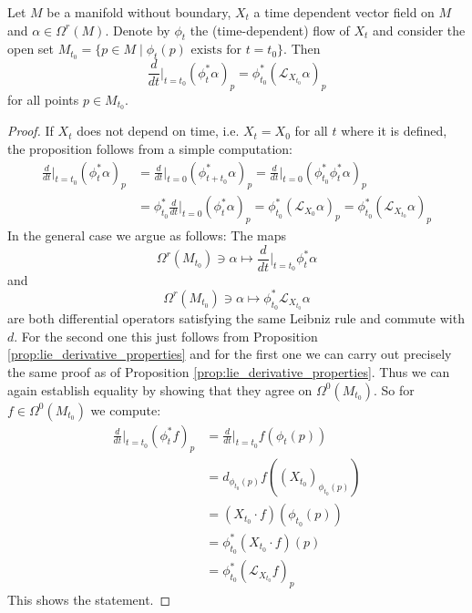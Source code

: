 \begin{proposition}
    \label{prop:lie_derivative_formula}
    Let $M$ be a manifold without boundary, $X_t$ a time dependent vector field on $M$ and $\alpha \in \Omega^r(M).$ Denote by $\phi_t$ the (time-dependent) flow of $X_t$ and consider the open set $M_{t_0} = \{p\in M \mid \phi_t(p) \text{ exists for } t=t_0\}$. Then
    \[
        \frac{d}{dt}\bigg|_{t=t_0}(\phi_t^\ast\alpha)_p = \phi_{t_0}^\ast(\mathcal{L}_{X_{t_0}} \alpha)_p
    \]
    for all points $p \in M_{t_0}$.
\end{proposition}
\begin{proof}
    If $X_t$ does not depend on time, i.e. $X_t = X_0$ for all $t$ where it is defined, the proposition follows from a simple computation:
    \begin{align*}
        \frac{d}{dt}\bigg|_{t=t_0}(\phi_t^\ast\alpha)_p &= \frac{d}{dt}\bigg|_{t=0}(\phi_{t+t_0}^\ast\alpha)_p = \frac{d}{dt}\bigg|_{t=0}(\phi_{t_0}^\ast\phi_t^\ast\alpha)_p \\
        &= \phi_{t_0}^\ast \frac{d}{dt}\bigg|_{t=0} (\phi_t^\ast\alpha)_p = \phi_{t_0}^\ast (\mathcal{L}_{X_0} \alpha)_p = \phi_{t_0}^\ast (\mathcal{L}_{X_{t_0}} \alpha)_p
    \end{align*}
    In the general case we argue as follows: The maps
    \[
    \Omega^r(M_{t_0}) \ni \alpha \mapsto \frac{d}{dt}\bigg|_{t=t_0}\phi_t^\ast\alpha
    \]
    and 
    \[
        \Omega^r(M_{t_0}) \ni \alpha \mapsto \phi_{t_0}^\ast \mathcal{L}_{X_{t_0}} \alpha 
    \]
    are both differential operators satisfying the same Leibniz rule and commute with $d$. For the second one this just follows from Proposition \ref{prop:lie_derivative_properties} and for the first one we can carry out precisely the same proof as of Proposition \ref{prop:lie_derivative_properties}. Thus we can again establish equality by showing that they agree on $\Omega^0(M_{t_0})$. So for $f \in \Omega^0(M_{t_0})$ we compute:
    \begin{align*}
        \frac{d}{d t}\bigg|_{t=t_0} (\phi_t^\ast f)_p &= \frac{d}{d t}\bigg|_{t=t_0} f(\phi_t(p)) \\
        &= d_{\phi_{t_0}(p)}f((X_{t_0})_{\phi_{t_0}(p)}) \\
        &= (X_{t_0} \cdot f)(\phi_{t_0}(p))\\
        &= \phi_{t_0}^\ast(X_{t_0} \cdot f)(p)\\
        &= \phi_{t_0}^\ast(\mathcal{L}_{X_{t_0}}f)_p
    \end{align*}
    This shows the statement.
\end{proof}

